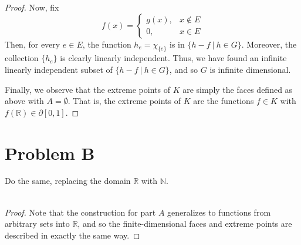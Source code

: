 \documentclass[fontsize=11pt]{scrartcl} %
\numberwithin{equation}{section} %
\numberwithin{figure}{section} %
\numberwithin{table}{section} %
\newcommand{\R}{\mathbb{R}}
\newcommand{\N}{\mathbb{N}}
\begin{document}
\begin{proof}
    Now, fix
    \[
        f(x) =
        \begin{cases}
            g(x), &x\not\in E\\
            0, &x\in E
        \end{cases}
    \]
    Then, for every $e\in E$, the function $h_e = \chi_{\{e\}}$ is in $\{h-f\ |\
    h\in G\}$. Moreover, the collection $\{h_e\}$ is clearly linearly
    independent. Thus, we have found an infinite linearly independent subset of
    $\{h-f\ |\ h\in G\}$, and so $G$ is infinite dimensional.

    Finally, we observe that the extreme points of $K$ are simply the faces
    defined as above with $A=\emptyset$. That is, the extreme points of $K$ are
    the functions $f\in K$ with $f(\R)\in\partial[0,1]$.
\end{proof}

\section*{Problem B}
Do the same, replacing the domain $\R$ with $\N$.
\\
\\
\begin{proof}
    Note that the construction for part $A$ generalizes to functions from
    arbitrary sets into $\R$, and so the finite-dimensional faces and extreme
    points are described in exactly the same way.
\end{proof}

\newpage
\end{document}
